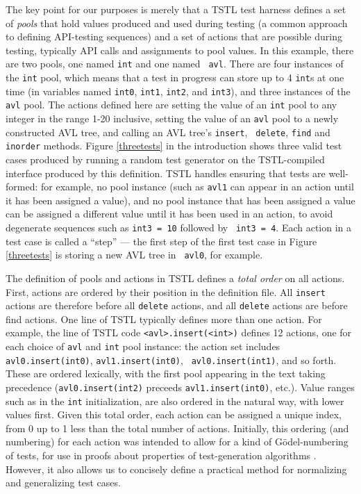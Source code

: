 The key point for our purposes is merely that a TSTL test harness
defines a set of \emph{pools} that hold values produced and used
during testing \cite{AndrewsTR} (a common approach to defining
API-testing sequences) and a set of actions that are possible during
testing, typically API calls and assignments to pool values.  In this
example, there are two pools, one named {\tt int} and one named {\tt
  avl}.  There are four instances of the {\tt int} pool, which means
that a test in progress can store up to 4 {\tt int}s at one time (in
variables named {\tt int0}, {\tt int1}, {\tt int2}, and {\tt int3}), and three
instances of the {\tt avl} pool.  The actions defined here are setting
the value of an {\tt int} pool to any integer in the range 1-20
inclusive, setting the value of an {\tt avl} pool to a newly
constructed AVL tree, and calling an AVL tree's {\tt insert}, {\tt
  delete}, {\tt find} and {\tt inorder} methods.  Figure
\ref{threetests} in the introduction shows three
valid test cases produced by running a random test generator on
the TSTL-compiled interface produced by this definition.  TSTL handles
ensuring that tests are well-formed: for example, no pool instance
(such as {\tt avl1} can appear in an action until it has been assigned
a value), and no pool instance that has been assigned a value can be
assigned a different value until it has been used in an action, to
avoid degenerate sequences such as {\tt int3 = 10} followed by {\tt
  int3 = 4}.  Each action in a test case is called a ``step'' --- the
first step of the first test case in Figure \ref{threetests} is storing a new AVL tree in {\tt
  avl0}, for example.

The definition of pools and actions in TSTL defines a \emph{total
  order} on all actions.  First, actions are ordered by their position
in the definition file.  All {\tt insert} actions are therefore before
all {\tt delete} actions, and all {\tt delete} actions are before find
actions.  One line of TSTL typically defines more than one action. For
example, the line of TSTL code {\tt <avl>.insert(<int>)} defines 12 actions, one
for each choice of {\tt avl} and {\tt int} pool instance:  the action set
includes {\tt avl0.insert(int0)}, {\tt avl1.insert(int0)}, {\tt
  avl0.insert(int1)}, and so forth.  These are
ordered lexically, with the first pool appearing in the text taking
precedence ({\tt avl0.insert(int2)} preceeds {\tt avl1.insert(int0)},
etc.).  Value ranges such as in the {\tt int} initialization, are also
ordered in the natural way, with lower values first.  Given this total
order, each action can be assigned a unique index, from 0 up to 1 less
than the total number of actions. Initially, this ordering (and
numbering) for each action was intended to allow for a kind of
G\"odel-numbering of tests, for use in proofs about
properties of test-generation algorithms
\cite{AndrewsTR}.  However, it also allows us to concisely define a
practical method for normalizing and generalizing test cases.

